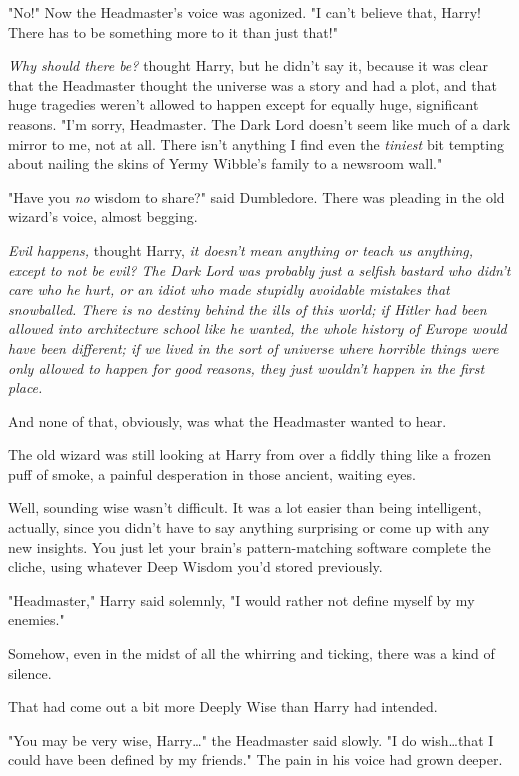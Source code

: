 "No!" Now the Headmaster’s voice was agonized. "I can’t believe that, Harry!
There has to be something more to it than just that!"

\emph{Why should there be?} thought Harry, but he didn’t say it, because it was
clear that the Headmaster thought the universe was a story and had a plot, and
that huge tragedies weren’t allowed to happen except for equally huge,
significant reasons. "I’m sorry, Headmaster. The Dark Lord doesn’t seem like
much of a dark mirror to me, not at all. There isn’t anything I find even the
\emph{tiniest} bit tempting about nailing the skins of Yermy Wibble’s family to
a newsroom wall."

"Have you \emph{no} wisdom to share?" said Dumbledore. There was pleading in
the old wizard’s voice, almost begging.

\emph{Evil happens,} thought Harry, \emph{it doesn’t mean anything or teach us
anything, except to not be evil? The Dark Lord was probably just a selfish
bastard who didn’t care who he hurt, or an idiot who made stupidly avoidable
mistakes that snowballed. There is no destiny behind the ills of this world; if
Hitler had been allowed into architecture school like he wanted, the whole
history of Europe would have been different; if we lived in the sort of
universe where horrible things were only allowed to happen for good reasons,
they just wouldn’t happen in the first place.}

And none of that, obviously, was what the Headmaster wanted to hear.

The old wizard was still looking at Harry from over a fiddly thing like a
frozen puff of smoke, a painful desperation in those ancient, waiting eyes.

Well, sounding wise wasn’t difficult. It was a lot easier than being
intelligent, actually, since you didn’t have to say anything surprising or come
up with any new insights. You just let your brain’s pattern-matching software
complete the cliche, using whatever Deep Wisdom you’d stored previously.

"Headmaster," Harry said solemnly, "I would rather not define myself by my
enemies."

Somehow, even in the midst of all the whirring and ticking, there was a kind of
silence.

That had come out a bit more Deeply Wise than Harry had intended.

"You may be very wise, Harry…" the Headmaster said slowly. "I do
wish…that I could have been defined by my friends." The pain in his
voice had grown deeper.

